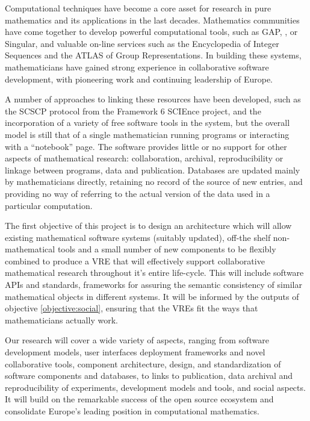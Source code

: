 \documentclass[noworkareas,deliverables,keys]{euproposal}                  %
\begin{document}
\begin{proposal}
Computational techniques have become a core asset for research in pure
  mathematics and its applications in the last decades. Mathematics
  communities have come together to develop powerful computational
  tools, such as GAP, \PariGP, \Sage or Singular, and valuable on-line
  services such as the Encyclopedia of Integer Sequences and the ATLAS
  of Group Representations.  In building these systems, 
  mathematicians have gained strong
  experience in collaborative software development, with pioneering
  work and continuing leadership of Europe.

A number of approaches to linking these resources have been developed,
such as the SCSCP protocol from the Framework 6 SCIEnce project, and
the incorporation of a variety of free software tools in the \Sage 
system, but the overall model is still that of a single mathematician
running programs or interacting with a ``notebook''
page. The software provides little or no support for other aspects of
mathematical research: collaboration,
archival, reproducibility or linkage between programs, data and
publication. Databases are updated mainly by mathematicians directly,
retaining no record of the source of new entries, and providing no way
of referring to the actual version of the data used in a particular
computation.

The first objective of this project is to design an architecture which
will allow existing mathematical software systems (suitably updated), 
off-the shelf non-mathematical tools and a small number of new
components to be flexibly combined to produce a VRE that will
effectively support collaborative mathematical research throughout
it's entire life-cycle. This will include software APIs and standards,
frameworks for assuring the semantic consistency of similar
mathematical objects in different systems.  It will be informed by the
outputs of objective \ref{objective:social}, ensuring that the VREs
fit the ways that mathematicians actually work.


Our research will cover a wide variety of aspects, ranging from
software development models, user interfaces   deployment frameworks and novel collaborative tools,
component architecture, design, and standardization of software
components and databases, to links to publication, data archival and
reproducibility of experiments, development models and tools, and
social aspects. It will build on the remarkable success of the open
source ecosystem and consolidate Europe's leading position in
computational mathematics.


\end{proposal}
\end{document}

